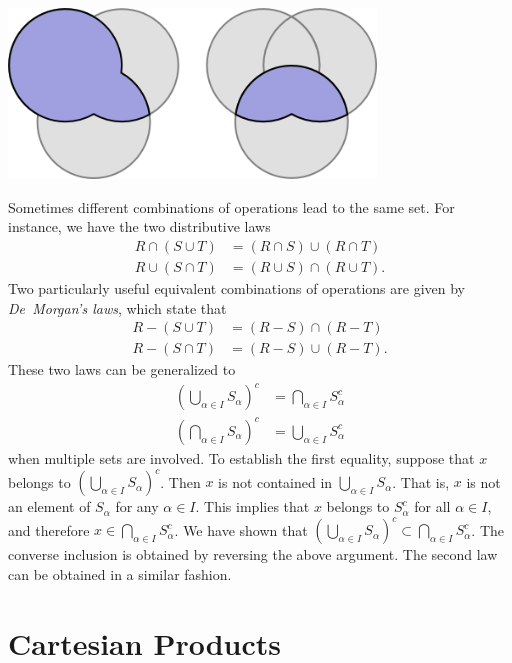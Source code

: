 \begin{center}
\includegraphics[height=4.53cm]{Figures/1Chapter/triple}
\end{center}

Sometimes different combinations of operations lead to the same set.
For instance, we have the two distributive laws
\begin{align*}
R \cap (S \cup T) &= (R \cap S) \cup (R \cap T) \\
R \cup (S \cap T) &= (R \cup S) \cap (R \cup T).
\end{align*}
Two particularly useful equivalent combinations of operations are given by \emph{De~Morgan's laws}, which state that
\begin{align*}
R - (S \cup T) &= (R - S) \cap (R - T) \\
R - (S \cap T) &= (R - S) \cup (R - T).
\end{align*}
These two laws can be generalized to
\begin{align*}
\left( \bigcup_{\alpha \in I} S_{\alpha} \right)^c
&= \bigcap_{\alpha \in I} S_{\alpha}^c \\
\left( \bigcap_{\alpha \in I} S_{\alpha} \right)^c
&= \bigcup_{\alpha \in I} S_{\alpha}^c
\end{align*}
when multiple sets are involved.
To establish the first equality, suppose that $x$ belongs to $\left( \bigcup_{\alpha \in I} S_{\alpha} \right)^c$.
Then $x$ is not contained in $\bigcup_{\alpha \in I} S_{\alpha}$.
That is, $x$ is not an element of $S_{\alpha}$ for any $\alpha \in I$.
This implies that $x$ belongs to $S_{\alpha}^c$ for all $\alpha \in I$, and therefore $x \in \bigcap_{\alpha \in I} S_{\alpha}^c$.
We have shown that $\left( \bigcup_{\alpha \in I} S_{\alpha} \right)^c \subset \bigcap_{\alpha \in I} S_{\alpha}^c$.
The converse inclusion is obtained by reversing the above argument.
The second law can be obtained in a similar fashion.


\section{Cartesian Products}

